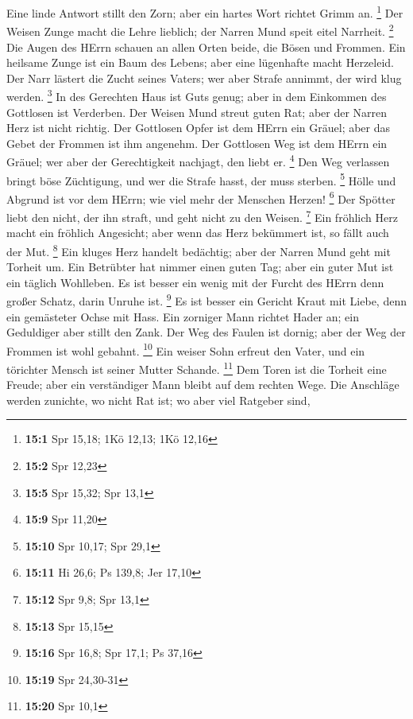  Eine linde Antwort stillt den Zorn; aber ein hartes Wort
richtet Grimm an. \footnote{\textbf{15:1} Spr 15,18; 1Kö 12,13; 1Kö
  12,16}  Der Weisen Zunge macht die Lehre lieblich; der
Narren Mund speit eitel Narrheit. \footnote{\textbf{15:2} Spr 12,23}
 Die Augen des HErrn schauen an allen Orten beide, die
Bösen und Frommen.  Ein heilsame Zunge ist ein Baum des
Lebens; aber eine lügenhafte macht Herzeleid.  Der Narr
lästert die Zucht seines Vaters; wer aber Strafe annimmt, der wird klug
werden. \footnote{\textbf{15:5} Spr 15,32; Spr 13,1}  In
des Gerechten Haus ist Guts genug; aber in dem Einkommen des Gottlosen
ist Verderben.  Der Weisen Mund streut guten Rat; aber der
Narren Herz ist nicht richtig.  Der Gottlosen Opfer ist
dem HErrn ein Gräuel; aber das Gebet der Frommen ist ihm angenehm.
 Der Gottlosen Weg ist dem HErrn ein Gräuel; wer aber der
Gerechtigkeit nachjagt, den liebt er. \footnote{\textbf{15:9} Spr 11,20}
 Den Weg verlassen bringt böse Züchtigung, und wer die
Strafe hasst, der muss sterben. \footnote{\textbf{15:10} Spr 10,17; Spr
  29,1}  Hölle und Abgrund ist vor dem HErrn; wie viel
mehr der Menschen Herzen! \footnote{\textbf{15:11} Hi 26,6; Ps 139,8;
  Jer 17,10}  Der Spötter liebt den nicht, der ihn
straft, und geht nicht zu den Weisen. \footnote{\textbf{15:12} Spr 9,8;
  Spr 13,1}  Ein fröhlich Herz macht ein fröhlich
Angesicht; aber wenn das Herz bekümmert ist, so fällt auch der Mut.
\footnote{\textbf{15:13} Spr 15,15}  Ein kluges Herz
handelt bedächtig; aber der Narren Mund geht mit Torheit um.
 Ein Betrübter hat nimmer einen guten Tag; aber ein guter
Mut ist ein täglich Wohlleben.  Es ist besser ein wenig
mit der Furcht des HErrn denn großer Schatz, darin Unruhe ist.
\footnote{\textbf{15:16} Spr 16,8; Spr 17,1; Ps 37,16} 
Es ist besser ein Gericht Kraut mit Liebe, denn ein gemästeter Ochse mit
Hass.  Ein zorniger Mann richtet Hader an; ein Geduldiger
aber stillt den Zank.  Der Weg des Faulen ist dornig;
aber der Weg der Frommen ist wohl gebahnt. \footnote{\textbf{15:19} Spr
  24,30-31}  Ein weiser Sohn erfreut den Vater, und ein
törichter Mensch ist seiner Mutter Schande. \footnote{\textbf{15:20} Spr
  10,1}  Dem Toren ist die Torheit eine Freude; aber ein
verständiger Mann bleibt auf dem rechten Wege.  Die
Anschläge werden zunichte, wo nicht Rat ist; wo aber viel Ratgeber sind,
